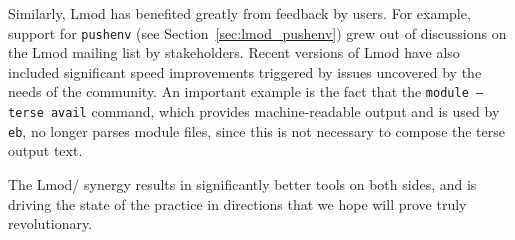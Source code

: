 Similarly, Lmod has benefited greatly from feedback by \easybuild{} users.
For example, support for \texttt{pushenv} (see
Section~\ref{sec:lmod_pushenv}) grew out of discussions on the Lmod
mailing list by \easybuild{} stakeholders. Recent versions of Lmod
have also included significant speed improvements triggered by issues
uncovered by the needs of the \easybuild{} community. An important example is the fact that
the \texttt{module --terse avail}
command, which provides machine-readable output and is used by \texttt{\small eb},
no longer parses module files, since this is not necessary to compose the terse output text.

The Lmod/\easybuild{} synergy results in significantly better tools on both sides, and is driving the state of the practice in directions that we hope will prove truly revolutionary.
